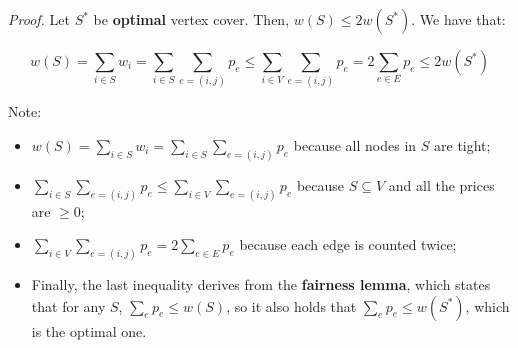 
\textit{Proof.} Let $S^*$ be \textbf{optimal} vertex cover. Then, $w(S) \leq 2w(S^*)$. We have that:

$$
w(S) = \sum_{i \in S} w_i = \sum_{i \in S} \sum_{e = (i,j)} p_e \leq \sum_{i \in V} \sum_{e = (i,j)} p_e = 2 \sum_{e \in E} p_e \leq 2w(S^*)
$$

Note:
\begin{itemize}
    \item $w(S) = \sum_{i \in S} w_i = \sum_{i \in S} \sum_{e = (i,j)} p_e$ because all nodes in $S$ are tight;
    \item $\sum_{i \in S} \sum_{e = (i,j)} p_e \leq \sum_{i \in V} \sum_{e = (i,j)} p_e$ because $S \subseteq V$ and all the prices are $\geq 0$;
    \item $\sum_{i \in V} \sum_{e = (i,j)} p_e = 2 \sum_{e \in E} p_e$ because each edge is counted twice;
    \item Finally, the last inequality derives from the \textbf{fairness lemma}, which states that for any $S$, $\sum_e p_e \leq w(S)$, so it also holds that $\sum_e p_e \leq w(S^*)$, which is the optimal one.
\end{itemize}

\newpage
